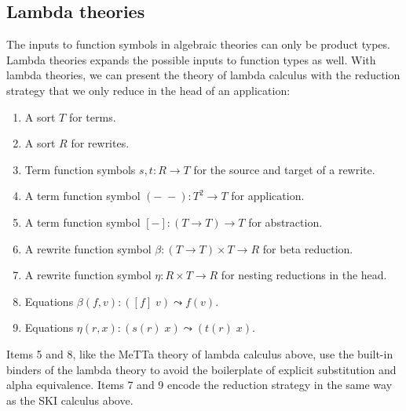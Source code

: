 \documentclass{article}
\begin{document}
\subsection{Lambda theories}

The inputs to function symbols in algebraic theories can only be product types.  Lambda theories expands the possible inputs to function types as well.  With lambda theories, we can present the theory of lambda calculus with the reduction strategy that we only reduce in the head of an application:
\begin{enumerate}
    \item A sort $T$ for terms.
    \item A sort $R$ for rewrites.
    \item Term function symbols $s, t\colon R \to T$ for the source and target of a rewrite.
    \item A term function symbol $(-\; -)\colon T^2 \to T$ for application.
    \item A term function symbol $[-]\colon (T \to T) \to T$ for abstraction.
    \item A rewrite function symbol $\beta\colon (T \to T) \times T \to R$ for beta reduction.
    \item A rewrite function symbol $\eta\colon R \times T \to R$ for nesting reductions in the head.
    \item Equations $\beta(f, v)\colon ([f]\; v) \leadsto f(v).$
    \item Equations $\eta(r, x)\colon (s(r)\; x) \leadsto (t(r)\; x).$
\end{enumerate}
Items 5 and 8, like the MeTTa theory of lambda calculus above, use the built-in binders of the lambda theory to avoid the boilerplate of explicit substitution and alpha equivalence.  Items 7 and 9 encode the reduction strategy in the same way as the SKI calculus above.
\end{document}

